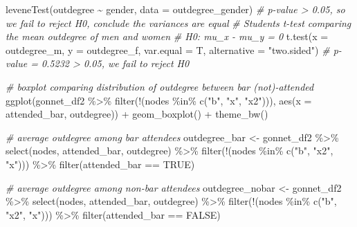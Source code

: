 \documentclass[12pt]{article}
\newenvironment{Shaded}{\begin{snugshade}}{\end{snugshade}}
\newcommand{\AttributeTok}[1]{\textcolor[rgb]{0.77,0.63,0.00}{#1}}
\newcommand{\CommentTok}[1]{\textcolor[rgb]{0.56,0.35,0.01}{\textit{#1}}}
\newcommand{\ConstantTok}[1]{\textcolor[rgb]{0.00,0.00,0.00}{#1}}
\newcommand{\FunctionTok}[1]{\textcolor[rgb]{0.00,0.00,0.00}{#1}}
\newcommand{\NormalTok}[1]{#1}
\newcommand{\OtherTok}[1]{\textcolor[rgb]{0.56,0.35,0.01}{#1}}
\newcommand{\SpecialCharTok}[1]{\textcolor[rgb]{0.00,0.00,0.00}{#1}}
\newcommand{\StringTok}[1]{\textcolor[rgb]{0.31,0.60,0.02}{#1}}
\begin{document}
\begin{Shaded}
\begin{Highlighting}[]
\FunctionTok{leveneTest}\NormalTok{(outdegree }\SpecialCharTok{\textasciitilde{}}\NormalTok{ gender, }
           \AttributeTok{data =}\NormalTok{ outdegree\_gender)}
\CommentTok{\# p{-}value \textgreater{} 0.05, so we fail to reject H0, conclude the variances are equal}
\CommentTok{\# Student\textquotesingle{}s t{-}test comparing the mean outdegree of men and women}
\CommentTok{\# H0: mu\_x {-} mu\_y = 0}
\FunctionTok{t.test}\NormalTok{(}\AttributeTok{x =}\NormalTok{ outdegree\_m, }
       \AttributeTok{y =}\NormalTok{ outdegree\_f,}
       \AttributeTok{var.equal =}\NormalTok{ T, }\AttributeTok{alternative =} \StringTok{"two.sided"}\NormalTok{)}
\CommentTok{\# p{-}value = 0.5232 \textgreater{} 0.05, we fail to reject H0}


\CommentTok{\# boxplot comparing distribution of outdegree between bar (not){-}attended}
\FunctionTok{ggplot}\NormalTok{(gonnet\_df2 }\SpecialCharTok{\%\textgreater{}\%} \FunctionTok{filter}\NormalTok{(}\SpecialCharTok{!}\NormalTok{(nodes }\SpecialCharTok{\%in\%} \FunctionTok{c}\NormalTok{(}\StringTok{"b"}\NormalTok{, }\StringTok{"x"}\NormalTok{, }\StringTok{"x2"}\NormalTok{))), }
       \FunctionTok{aes}\NormalTok{(}\AttributeTok{x =}\NormalTok{ attended\_bar, outdegree)) }\SpecialCharTok{+} 
  \FunctionTok{geom\_boxplot}\NormalTok{() }\SpecialCharTok{+} \FunctionTok{theme\_bw}\NormalTok{()}

\CommentTok{\# average outdegree among bar attendees}
\NormalTok{outdegree\_bar }\OtherTok{\textless{}{-}}\NormalTok{ gonnet\_df2 }\SpecialCharTok{\%\textgreater{}\%} 
  \FunctionTok{select}\NormalTok{(nodes, attended\_bar, outdegree) }\SpecialCharTok{\%\textgreater{}\%}
  \FunctionTok{filter}\NormalTok{(}\SpecialCharTok{!}\NormalTok{(nodes }\SpecialCharTok{\%in\%} \FunctionTok{c}\NormalTok{(}\StringTok{"b"}\NormalTok{, }\StringTok{"x2"}\NormalTok{, }\StringTok{"x"}\NormalTok{))) }\SpecialCharTok{\%\textgreater{}\%}
  \FunctionTok{filter}\NormalTok{(attended\_bar }\SpecialCharTok{==} \ConstantTok{TRUE}\NormalTok{)}

\CommentTok{\# average outdegree among non{-}bar attendees}
\NormalTok{outdegree\_nobar }\OtherTok{\textless{}{-}}\NormalTok{ gonnet\_df2 }\SpecialCharTok{\%\textgreater{}\%} 
  \FunctionTok{select}\NormalTok{(nodes, attended\_bar, outdegree) }\SpecialCharTok{\%\textgreater{}\%}
  \FunctionTok{filter}\NormalTok{(}\SpecialCharTok{!}\NormalTok{(nodes }\SpecialCharTok{\%in\%} \FunctionTok{c}\NormalTok{(}\StringTok{"b"}\NormalTok{, }\StringTok{"x2"}\NormalTok{, }\StringTok{"x"}\NormalTok{))) }\SpecialCharTok{\%\textgreater{}\%}
  \FunctionTok{filter}\NormalTok{(attended\_bar }\SpecialCharTok{==} \ConstantTok{FALSE}\NormalTok{)}


\end{Highlighting}
\end{Shaded}
\end{document}

